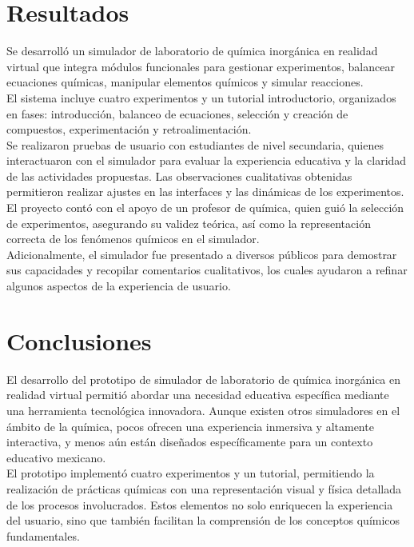 \documentclass[conference]{IEEEtran}
\begin{document}
\section{Resultados}

Se desarrolló un simulador de laboratorio de química inorgánica en realidad virtual que integra módulos funcionales para gestionar experimentos, balancear ecuaciones químicas, manipular elementos químicos y simular reacciones.\\

El sistema incluye cuatro experimentos y un tutorial introductorio, organizados en fases: introducción, balanceo de ecuaciones, selección y creación de compuestos, experimentación y retroalimentación.\\

Se realizaron pruebas de usuario con estudiantes de nivel secundaria, quienes interactuaron con el simulador para evaluar la experiencia educativa y la claridad de las actividades propuestas. Las observaciones cualitativas obtenidas permitieron realizar ajustes en las interfaces y las dinámicas de los experimentos.\\

El proyecto contó con el apoyo de un profesor de química, quien guió la selección de experimentos, asegurando su validez teórica, así como la representación correcta de los fenómenos químicos en el simulador.\\

Adicionalmente, el simulador fue presentado a diversos públicos para demostrar sus capacidades y recopilar comentarios cualitativos, los cuales ayudaron a refinar algunos aspectos de la experiencia de usuario.

\section{Conclusiones}

El desarrollo del prototipo de simulador de laboratorio de química inorgánica en realidad virtual permitió abordar una necesidad educativa específica mediante una herramienta tecnológica innovadora. Aunque existen otros simuladores en el ámbito de la química, pocos ofrecen una experiencia inmersiva y altamente interactiva, y menos aún están diseñados específicamente para un contexto educativo mexicano.\\

El prototipo implementó cuatro experimentos y un tutorial, permitiendo la realización de prácticas químicas con una representación visual y física detallada de los procesos involucrados. Estos elementos no solo enriquecen la experiencia del usuario, sino que también facilitan la comprensión de los conceptos químicos fundamentales.\\
\end{document}
